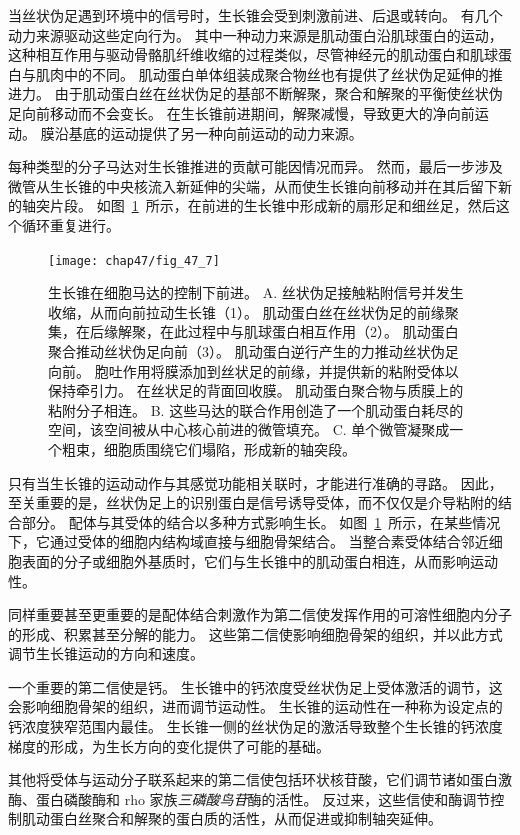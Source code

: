 当丝状伪足遇到环境中的信号时，生长锥会受到刺激前进、后退或转向。
有几个动力来源驱动这些定向行为。
其中一种动力来源是肌动蛋白沿肌球蛋白的运动，这种相互作用与驱动骨骼肌纤维收缩的过程类似，尽管神经元的肌动蛋白和肌球蛋白与肌肉中的不同。
肌动蛋白单体组装成聚合物丝也有提供了丝状伪足延伸的推进力。
由于肌动蛋白丝在丝状伪足的基部不断解聚，聚合和解聚的平衡使丝状伪足向前移动而不会变长。
在生长锥前进期间，解聚减慢，导致更大的净向前运动。
膜沿基底的运动提供了另一种向前运动的动力来源。


每种类型的分子马达对生长锥推进的贡献可能因情况而异。
然而，最后一步涉及微管从生长锥的中央核流入新延伸的尖端，从而使生长锥向前移动并在其后留下新的轴突片段。
如图~\ref{fig:47_7}~所示，在前进的生长锥中形成新的扇形足和细丝足，然后这个循环重复进行。


\begin{figure}[htbp]
	\centering
	\texttt{[image: chap47/fig\_47\_7]}
	\caption{生长锥在细胞马达的控制下前进\cite{heidemann1996cytoplasmic}。
		A. 丝状伪足接触粘附信号并发生收缩，从而向前拉动生长锥（1）。
		肌动蛋白丝在丝状伪足的前缘聚集，在后缘解聚，在此过程中与肌球蛋白相互作用（2）。
		肌动蛋白聚合推动丝状伪足向前（3）。
		肌动蛋白逆行产生的力推动丝状伪足向前。
		胞吐作用将膜添加到丝状足的前缘，并提供新的粘附受体以保持牵引力。
		在丝状足的背面回收膜。
		肌动蛋白聚合物与质膜上的粘附分子相连。
		B. 这些马达的联合作用创造了一个肌动蛋白耗尽的空间，该空间被从中心核心前进的微管填充。
		C. 单个微管凝聚成一个粗束，细胞质围绕它们塌陷，形成新的轴突段。}
	\label{fig:47_7}
\end{figure}


只有当生长锥的运动动作与其感觉功能相关联时，才能进行准确的寻路。
因此，至关重要的是，丝状伪足上的识别蛋白是信号诱导受体，而不仅仅是介导粘附的结合部分。
配体与其受体的结合以多种方式影响生长。
如图~\ref{fig:47_7}~所示，在某些情况下，它通过受体的细胞内结构域直接与细胞骨架结合。
当整合素受体结合邻近细胞表面的分子或细胞外基质时，它们与生长锥中的肌动蛋白相连，从而影响运动性。


同样重要甚至更重要的是配体结合刺激作为第二信使发挥作用的可溶性细胞内分子的形成、积累甚至分解的能力。
这些第二信使影响细胞骨架的组织，并以此方式调节生长锥运动的方向和速度。


一个重要的第二信使是钙。
生长锥中的钙浓度受丝状伪足上受体激活的调节，这会影响细胞骨架的组织，进而调节运动性。
生长锥的运动性在一种称为设定点的钙浓度狭窄范围内最佳。
生长锥一侧的丝状伪足的激活导致整个生长锥的钙浓度梯度的形成，为生长方向的变化提供了可能的基础。


其他将受体与运动分子联系起来的第二信使包括环状核苷酸，它们调节诸如蛋白激酶、蛋白磷酸酶和 rho 家族\textit{三磷酸鸟苷}酶的活性。
反过来，这些信使和酶调节控制肌动蛋白丝聚合和解聚的蛋白质的活性，从而促进或抑制轴突延伸。


